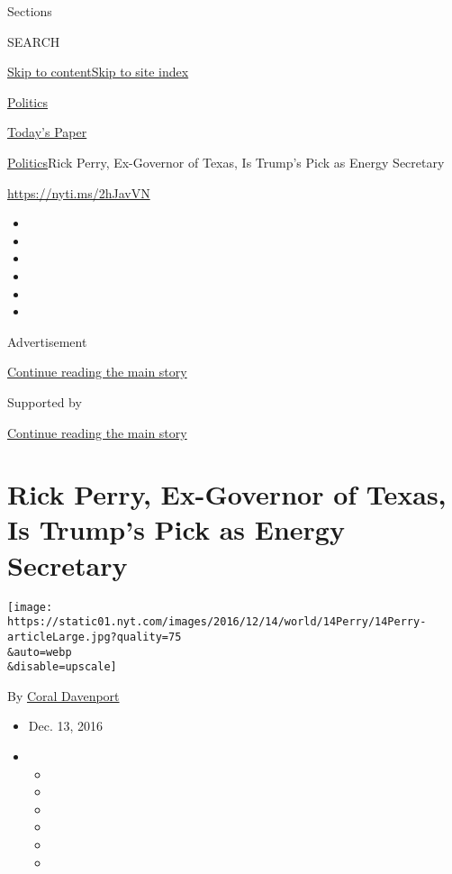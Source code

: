 Sections

SEARCH

\protect\hyperlink{site-content}{Skip to
content}\protect\hyperlink{site-index}{Skip to site index}

\href{https://www.nytimes.com/section/politics}{Politics}

\href{https://myaccount.nytimes.com/auth/login?response_type=cookie\&client_id=vi}{}

\href{https://www.nytimes.com/section/todayspaper}{Today's Paper}

\href{/section/politics}{Politics}\textbar{}Rick Perry, Ex-Governor of
Texas, Is Trump's Pick as Energy Secretary

\url{https://nyti.ms/2hJavVN}

\begin{itemize}
\item
\item
\item
\item
\item
\item
\end{itemize}

Advertisement

\protect\hyperlink{after-top}{Continue reading the main story}

Supported by

\protect\hyperlink{after-sponsor}{Continue reading the main story}

\hypertarget{rick-perry-ex-governor-of-texas-is-trumps-pick-as-energy-secretary}{%
\section{Rick Perry, Ex-Governor of Texas, Is Trump's Pick as Energy
Secretary}\label{rick-perry-ex-governor-of-texas-is-trumps-pick-as-energy-secretary}}

\texttt{[image: https://static01.nyt.com/images/2016/12/14/world/14Perry/14Perry-articleLarge.jpg?quality=75\\\&auto=webp\\\&disable=upscale]}

By \href{https://www.nytimes.com/by/coral-davenport}{Coral Davenport}

\begin{itemize}
\item
  Dec. 13, 2016
\item
  \begin{itemize}
  \item
  \item
  \item
  \item
  \item
  \item
  \end{itemize}
\end{itemize}

